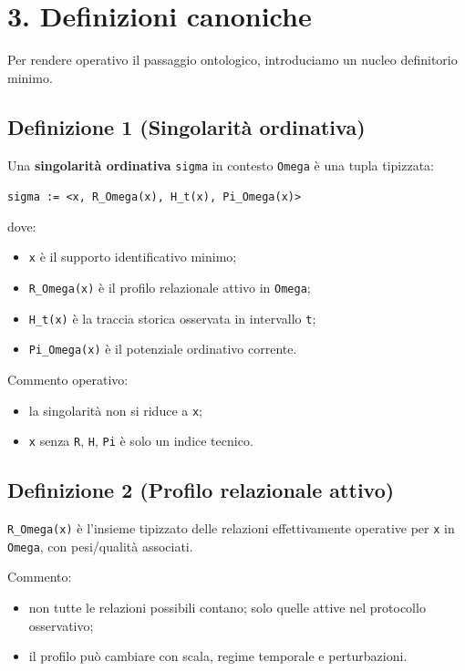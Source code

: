 \section{3. Definizioni canoniche}

Per rendere operativo il passaggio ontologico, introduciamo un nucleo definitorio minimo.

\subsection{Definizione 1 (Singolarità ordinativa)}

Una \textbf{singolarità ordinativa} \texttt{sigma} in contesto \texttt{Omega} è una tupla tipizzata:

\texttt{sigma\ :=\ \textless{}x,\ R\_Omega(x),\ H\_t(x),\ Pi\_Omega(x)\textgreater{}}

dove:

\begin{itemize}
\tightlist
\item
  \texttt{x} è il supporto identificativo minimo;
\item
  \texttt{R\_Omega(x)} è il profilo relazionale attivo in \texttt{Omega};
\item
  \texttt{H\_t(x)} è la traccia storica osservata in intervallo \texttt{t};
\item
  \texttt{Pi\_Omega(x)} è il potenziale ordinativo corrente.
\end{itemize}

Commento operativo:

\begin{itemize}
\tightlist
\item
  la singolarità non si riduce a \texttt{x};
\item
  \texttt{x} senza \texttt{R}, \texttt{H}, \texttt{Pi} è solo un indice tecnico.
\end{itemize}

\subsection{Definizione 2 (Profilo relazionale attivo)}

\texttt{R\_Omega(x)} è l'insieme tipizzato delle relazioni effettivamente operative per \texttt{x} in \texttt{Omega}, con pesi/qualità associati.

Commento:

\begin{itemize}
\tightlist
\item
  non tutte le relazioni possibili contano; solo quelle attive nel protocollo osservativo;
\item
  il profilo può cambiare con scala, regime temporale e perturbazioni.
\end{itemize}

